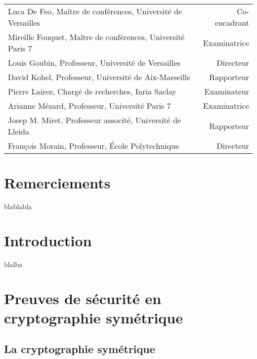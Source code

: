 \documentclass[a4paper, titlepage, 12pt]{book}
\begin{document}
\begin{breakbox}
\begin{tabular}{lr}
\noindent
Luca De Feo, Maître de conférences, Université de Versailles& Co-encadrant\\
Mireille Fouquet, Maître de conférences, Université Paris 7& Examinatrice\\
Louis Goubin, Professeur, Université de Versailles& Directeur\\
David Kohel, Professeur, Université de Aix-Marseille& Rapporteur\\
Pierre Lairez, Chargé de recherches, Inria Saclay& Examinateur\\ 
Arianne Mézard, Professeur, Université Paris 7& Examinatrice\\
Josep M. Miret, Professeur associté, Université de Lleida& Rapporteur\\
François Morain, Professeur, \'Ecole Polytechnique& Directeur\\

\end{tabular}

\vspace{6ex}

\end{breakbox}
\restoregeometry

\chapter*{Remerciements}

blablabla

\clearpage
\tableofcontents

\clearpage
\listoffigures



\mainmatter
\pagestyle{fancy}

\chapter*{Introduction}

blalba


\chapter{Preuves de sécurité en cryptographie symétrique}

\section{La cryptographie symétrique}
\end{document}
